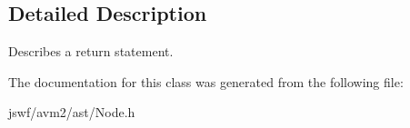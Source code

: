 \subsection{Detailed Description}
Describes a return statement. 

The documentation for this class was generated from the following file\+:\begin{DoxyCompactItemize}
\item 
jswf/avm2/ast/Node.\+h\end{DoxyCompactItemize}
